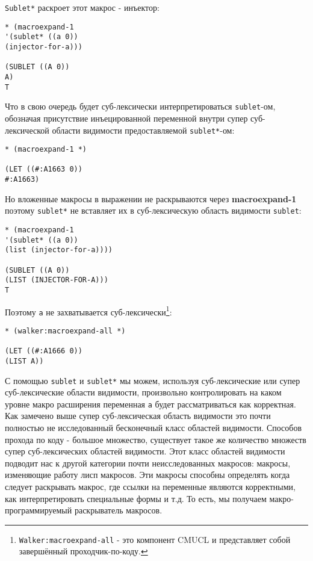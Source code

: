 \verb"Sublet*" раскроет этот макрос - инъектор:

\begin{verbatim}
* (macroexpand-1
'(sublet* ((a 0))
(injector-for-a)))

(SUBLET ((A 0))
A)
T
\end{verbatim}

Что в свою очередь будет суб-лексически интерпретироваться \verb"sublet"-ом, обозначая присутствие инъецированной переменной внутри супер суб-лексической области видимости предоставляемой \verb"sublet*"-ом:

\begin{verbatim}
* (macroexpand-1 *)

(LET ((#:A1663 0))
#:A1663)
\end{verbatim}

Но вложенные макросы в выражении не раскрываются через \textbf{mac\-ro\-ex\-pand-1} поэтому \verb"sublet*" не вставляет их в суб-лексическую область видимости \verb"sublet":

\begin{verbatim}
* (macroexpand-1
'(sublet* ((a 0))
(list (injector-for-a))))

(SUBLET ((A 0))
(LIST (INJECTOR-FOR-A)))
T
\end{verbatim}

Поэтому \verb"a" не захватывается суб-лексически\footnote{\verb"Walker:macroexpand-all" - это компонент CMUCL и представляет собой завершённый проходчик-по-коду.}:



\begin{verbatim}
* (walker:macroexpand-all *)

(LET ((#:A1666 0))
(LIST A))
\end{verbatim}

С помощью \verb"sublet" и \verb"sublet*" мы можем, используя суб-лексические или супер суб-лексические области видимости, произвольно контролировать на каком уровне макро расширения переменная \verb"a" будет рассматриваться как корректная. Как замечено выше супер суб-лексическая область видимости это почти полностью не исследованный бесконечный класс областей видимости. Способов прохода по коду - большое множество, существует такое же количество множеств супер суб-лексических областей видимости. Этот класс областей видимости подводит нас к другой категории почти неисследованных макросов: макросы, изменяющие работу лисп макросов. Эти макросы способны определять когда следует раскрывать макрос, где ссылки на переменные являются корректными, как интерпретировать специальные формы и т.д. То есть, мы получаем макро-программируемый раскрыватель макросов.

